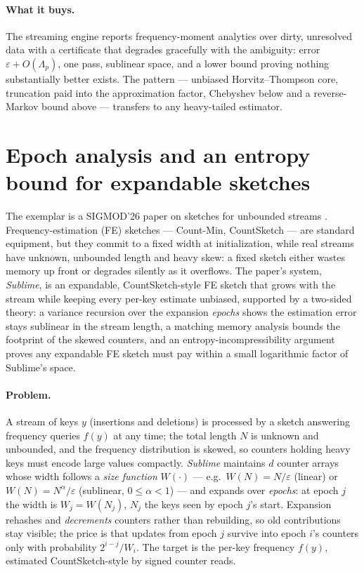 \paragraph{What it buys.}
The streaming engine reports frequency-moment analytics over dirty, unresolved data with a
certificate that degrades gracefully with the ambiguity: error $\varepsilon + O(\Lambda_p)$,
one pass, sublinear space, and a lower bound proving nothing substantially better exists. The
pattern --- unbiased Horvitz--Thompson core, truncation paid into the approximation factor,
Chebyshev below and a reverse-Markov bound above --- transfers to any heavy-tailed estimator.

\section{Epoch analysis and an entropy bound for expandable sketches}
\label{sec:est-sublime}

The exemplar is a SIGMOD'26 paper on sketches for unbounded streams \citep{sigmod26-231}.
Frequency-estimation (FE) sketches --- Count-Min, CountSketch --- are standard equipment, but they
commit to a fixed width at initialization, while real streams have unknown, unbounded length and
heavy skew: a fixed sketch either wastes memory up front or degrades silently as it overflows.
The paper's system, \emph{Sublime}, is an expandable, CountSketch-style FE sketch that grows
with the stream while keeping every per-key estimate unbiased, supported by a two-sided theory:
a variance recursion over the expansion \emph{epochs} shows the estimation error stays sublinear
in the stream length, a matching memory analysis bounds the footprint of the skewed counters,
and an entropy-incompressibility argument proves any expandable FE sketch must pay within a
small logarithmic factor of Sublime's space.

\paragraph{Problem.}
A stream of keys $y$ (insertions and deletions) is processed by a sketch answering frequency
queries $f(y)$ at any time; the total length $N$ is unknown and unbounded, and the frequency
distribution is skewed, so counters holding heavy keys must encode large values compactly.
\emph{Sublime} maintains $d$ counter arrays whose width follows a \emph{size function}
$W(\cdot)$ --- e.g.\ $W(N) = N/\varepsilon$ (linear) or $W(N) = N^\alpha/\varepsilon$
(sublinear, $0 \le \alpha < 1$) --- and expands over \emph{epochs}: at epoch $j$ the width is
$W_j = W(N_j)$, $N_j$ the keys seen by epoch $j$'s start. Expansion rehashes and
\emph{decrements} counters rather than rebuilding, so old contributions stay visible; the price
is that updates from epoch $j$ survive into epoch $i$'s counters only with probability
$2^{i-j}/W_i$. The target is the per-key frequency $f(y)$, estimated CountSketch-style by
signed counter reads.

